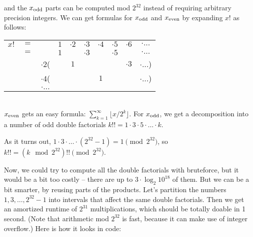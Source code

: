 \documentclass[openany]{book}
\begin{document}
and the $x_\text{odd}$ parts can be computed mod $2^{32}$ instead of requiring arbitrary precision integers. We can get formulas for $x_\text{odd}$ and $x_\text{even}$ by expanding $x!$ as follows: \\
\begin{tabular}{cccccccccc}
$x!$&$=$&          &$1$& $\cdot 2$ &$\cdot 3$ &$\cdot 4$ &$\cdot 5$ & $\cdot 6$ & $\cdot \ldots$ \\
    &$=$&          &$1$&           &$\cdot 3$ &          &$\cdot 5$ &           & $\cdot \ldots$ \\
    &   &$\cdot 2$(&   & $1$       &          &          &          & $\cdot 3$ & $\cdot \ldots$)\\
    &   &$\cdot 4$(&   &           &          &  $1$     &          &           & $\cdot \ldots$)\\
    &   &$\cdot \ldots$ &
\end{tabular}
\\
$x_\text{even}$ gets an easy formula: $\sum_{k=1}^\infty \lfloor x / 2^k \rfloor$.
For $x_\text{odd}$, we get a decomposition into a number of odd double factorials $k!! = 1 \cdot 3 \cdot 5 \cdot \ldots \cdot k$.

As it turns out, $1 \cdot 3 \cdot \ldots \cdot (2^{32}-1) = 1 \pmod{2^{32}}$, so $k!! = (k \mod 2^{32})!! \pmod{2^{32}}$.

Now, we could try to compute all the double factorials with bruteforce, but it would be a bit too costly -- there are up to $3 \cdot \log_2{10^{18}}$ of them. But we can be a bit smarter, by reusing parts of the products. Let's partition the numbers $1, 3, \dots, 2^{32}-1$ into intervals that affect the same double factorials. Then we get an amortized runtime of $2^{31}$ multiplications, which should be totally doable in 1 second. (Note that arithmetic mod $2^{32}$ is fast, because it can make use of integer overflow.) Here is how it looks in code:
\end{document}

